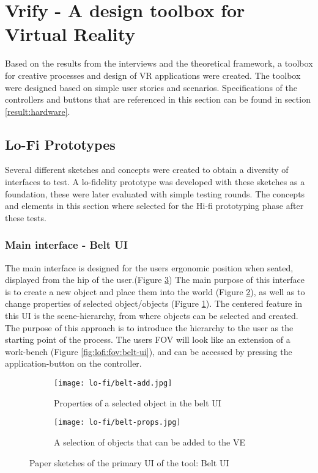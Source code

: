 \section{Vrify - A design toolbox for Virtual Reality}
Based on the results from the interviews and the theoretical framework, a toolbox for creative processes and design of VR applications were created. The toolbox were designed based on simple user stories and scenarios. Specifications of the controllers and buttons that are referenced in this section can be found in section \ref{result:hardware}.

\subsection{Lo-Fi Prototypes}
 Several different sketches and concepts were created to obtain a diversity of interfaces to test. A lo-fidelity prototype was developed with these sketches as a foundation, these were later evaluated with simple testing rounds. The concepts and elements in this section where selected for the Hi-fi prototyping phase after these tests.

\subsubsection{Main interface - Belt UI}
The main interface is designed for the users ergonomic position when seated, displayed from the hip of the user.(Figure \ref{fig:lofi:belt-ui}) The main purpose of this interface is to create a new object and place them into the world (Figure \ref{fig:lofi:belt-ui:add}), as well as to change properties of selected object/objects (Figure \ref{fig:lofi:belt-ui:props}). The centered feature in this UI is the scene-hierarchy, from where objects can be selected and created. The purpose of this approach is to introduce the hierarchy to the user as the starting point of the process. The users FOV will look like an extension of a work-bench (Figure \ref{fig:lofi:fov:belt-ui}), and can be accessed by pressing the application-button on the controller.

\begin{figure}
\begin{subfigure}{.5\textwidth}
  \centering
  \texttt{[image: lo-fi/belt-add.jpg]}
  \caption{Properties of a selected object in the belt UI}
  \label{fig:lofi:belt-ui:props}
\end{subfigure}%
\begin{subfigure}{.5\textwidth}
  \centering
  \texttt{[image: lo-fi/belt-props.jpg]}
  \caption{A selection of objects that can be added to the VE}
  \label{fig:lofi:belt-ui:add}
\end{subfigure}
\caption{Paper sketches of the primary UI of the tool: Belt UI}
\label{fig:lofi:belt-ui}
\end{figure}

